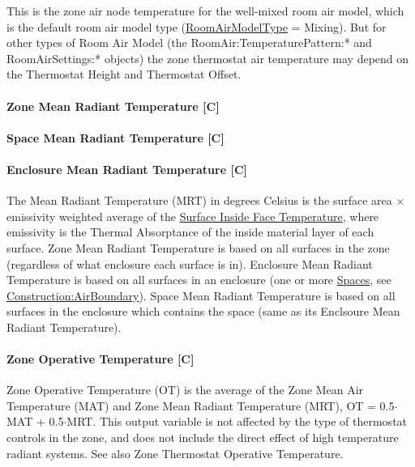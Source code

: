 This is the zone air node temperature for the well-mixed room air model, which is the default room air model type (\hyperref[roomairmodeltype]{RoomAirModelType} = Mixing). But for other types of Room Air Model (the RoomAir:TemperaturePattern:* and RoomAirSettings:* objects) the zone thermostat air temperature may depend on the Thermostat Height and Thermostat Offset.

\paragraph{Zone Mean Radiant Temperature {[}C{]}}\label{zone-mean-radiant-temperature-c}
\paragraph{Space Mean Radiant Temperature {[}C{]}}\label{space-mean-radiant-temperature-c}
\paragraph{Enclosure Mean Radiant Temperature {[}C{]}}\label{enclosure-mean-radiant-temperature-c}

The Mean Radiant Temperature (MRT) in degrees Celsius is the surface area $\times$ emissivity weighted average of the \hyperref[surface-inside-face-temperature-c]{Surface Inside Face Temperature}, where emissivity is the Thermal Absorptance of the inside material layer of each surface. Zone Mean Radiant Temperature is based on all surfaces in the zone (regardless of what enclosure each surface is in). Enclosure Mean Radiant Temperature is based on all surfaces in an enclosure (one or more \hyperref[space]{Spaces}, see \hyperref[constructionairboundary]{Construction:AirBoundary}). Space Mean Radiant Temperature is based on all surfaces in the enclosure which contains the space (same as its Enclsoure Mean Radiant Temperature).

\paragraph{Zone Operative Temperature {[}C{]}}\label{zone-operative-temperature-c}

Zone Operative Temperature (OT) is the average of the Zone Mean Air Temperature (MAT) and Zone Mean Radiant Temperature (MRT), OT = 0.5$\cdot$MAT + 0.5$\cdot$MRT. This output variable is not affected by the type of thermostat controls in the zone, and does not include the direct effect of high temperature radiant systems. See also Zone Thermostat Operative Temperature.

